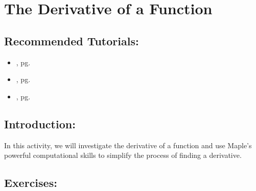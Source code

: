 \section{The Derivative of a Function}
\label{sec:derivative_of_a_function}

\subsection*{Recommended Tutorials:}
\begin{itemize}[noitemsep]
	\item {}, pg. \pageref{chp:assignment_operator}
	\item {}, pg. \pageref{chp:equation_solvers}
	\item {}, pg. \pageref{chp:derivative}
\end{itemize}

\subsection*{Introduction:}

In this activity, we will investigate the derivative of a function and use Maple's powerful computational skills to simplify the process of finding a derivative.

\subsection*{Exercises:}

